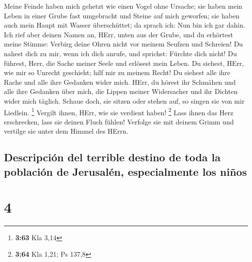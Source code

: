 Meine Feinde haben mich gehetzt wie einen Vogel ohne
Ursache;  sie haben mein Leben in einer Grube fast
umgebracht und Steine auf mich geworfen;  sie haben auch
mein Haupt mit Wasser überschüttet; da sprach ich: Nun bin ich gar
dahin.  Ich rief aber deinen Namen an, HErr, unten aus
der Grube,  und du erhörtest meine Stimme: Verbirg deine
Ohren nicht vor meinem Seufzen und Schreien!  Du nahest
dich zu mir, wenn ich dich anrufe, und sprichst: Fürchte dich nicht!
 Du führest, Herr, die Sache meiner Seele und erlösest
mein Leben.  Du siehest, HErr, wie mir so Unrecht
geschieht; hilf mir zu meinem Recht!  Du siehest alle
ihre Rache und alle ihre Gedanken wider mich.  HErr, du
hörest ihr Schmähen und alle ihre Gedanken über mich, 
die Lippen meiner Widersacher und ihr Dichten wider mich täglich.
 Schaue doch, sie sitzen oder stehen auf, so singen sie
von mir Liedlein. \footnote{\textbf{3:63} Kla 3,14} 
Vergilt ihnen, HErr, wie sie verdient haben! \footnote{\textbf{3:64} Kla
  1,21; Ps 137,8}  Lass ihnen das Herz erschrecken, lass
sie deinen Fluch fühlen!  Verfolge sie mit deinem Grimm
und vertilge sie unter dem Himmel des HErrn.

\hypertarget{descripciuxf3n-del-terrible-destino-de-toda-la-poblaciuxf3n-de-jerusaluxe9n-especialmente-los-niuxf1os}{%
\subsection{Descripción del terrible destino de toda la población de
Jerusalén, especialmente los
niños}\label{descripciuxf3n-del-terrible-destino-de-toda-la-poblaciuxf3n-de-jerusaluxe9n-especialmente-los-niuxf1os}}

\hypertarget{section-3}{%
\section{4}\label{section-3}}

